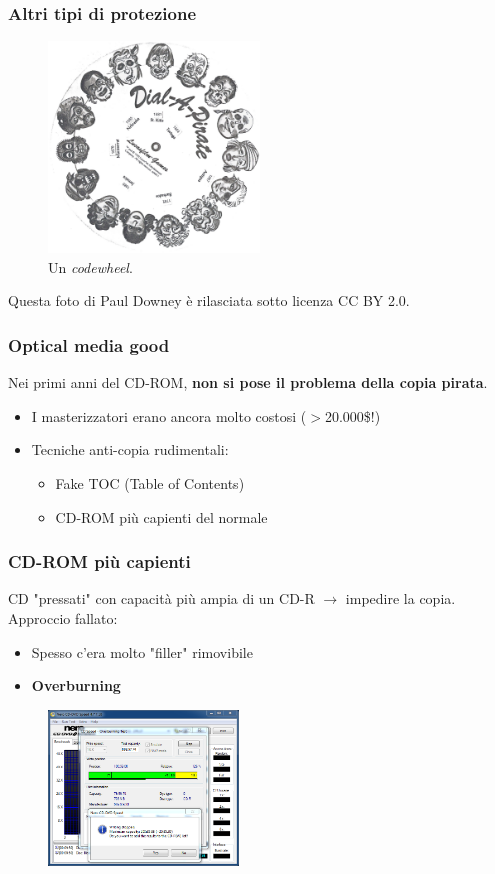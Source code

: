 \documentclass{beamer}
\begin{document}
	\begin{frame}
		\frametitle{Altri tipi di protezione}
		\begin{figure}[h]
			\centering
			\includegraphics[width=0.5\textwidth]{imgs/codewheel.jpg}
			\caption{Un \textit{codewheel}.}
			\label{pic:codewheel}
		\end{figure}
		\begin{center}
			\scriptsize Questa foto di Paul Downey è rilasciata sotto licenza CC BY 2.0.
		\end{center}
	\end{frame}
	\begin{frame}
		\frametitle{Optical media good}
		Nei primi anni del CD-ROM, \textbf{non si pose il problema della copia pirata}.
		\begin{itemize}
			\item I masterizzatori erano ancora molto costosi ($>$20.000\$!)
			\item Tecniche anti-copia rudimentali:
			\begin{itemize}
				\item Fake TOC (Table of Contents)
				\item CD-ROM più capienti del normale
			\end{itemize}
		\end{itemize}
	\end{frame}
	\begin{frame}
		\frametitle{CD-ROM più capienti}
		CD "pressati" con capacità più ampia di un CD-R $\to$ impedire la copia.\\
		Approccio fallato:
		\begin{itemize}
			\item Spesso c'era molto "filler" rimovibile
			\item \textbf{Overburning} 
		\end{itemize}
		\begin{figure}
			\includegraphics[width=0.45\textwidth]{imgs/nero.png}
		\end{figure}
	\end{frame}
\end{document}
